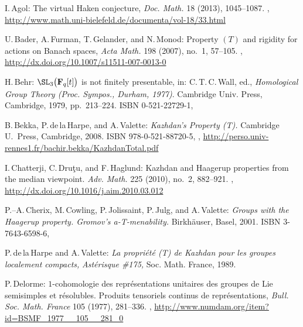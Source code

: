 \begin{references}{99}

I.\,Agol: 
The virtual Haken conjecture,
\emph{Doc. Math.} 18 (2013), 1045--1087. 
,
\url{http://www.math.uni-bielefeld.de/documenta/vol-18/33.html}

U.\,Bader, A.\,Furman, T.\,Gelander, and N.\,Monod:
Property $(T)$ and rigidity for actions on Banach spaces,
\emph{Acta Math.} 198 (2007), no.~1, 57--105. 
,
\url{http://dx.doi.org/10.1007/s11511-007-0013-0}

H.\,Behr:
$\SL_3 \bigl( \mathbf{F}_q[t] \bigr)$ is not finitely presentable,
in: C.\,T.\,C.\,Wall, ed.,
\emph{Homological Group Theory (Proc. Sympos., Durham, 1977)}.
Cambridge Univ. Press, Cambridge, 1979, pp.~213--224.
ISBN 0-521-22729-1,

B.\,Bekka, P.\,de\,la\,Harpe, and A.\,Valette:
\emph{Kazhdan's Property (T).}
Cambridge U.\ Press, Cambridge, 2008.
ISBN 978-0-521-88720-5,
,
\maynewline
\url{http://perso.univ-rennes1.fr/bachir.bekka/KazhdanTotal.pdf}

I.\,Chatterji, C.\,Dru\c tu, and F.\,Haglund:
Kazhdan and Haagerup properties from the median viewpoint. 
\emph{Adv. Math.} 225 (2010), no.~2, 882--921.
,
\maynewline
\url{http://dx.doi.org/10.1016/j.aim.2010.03.012}

P.--A.\,Cherix, M.\,Cowling, P.\,Jolissaint, P.\,Julg, and A.\,Valette:
\emph{Groups with the Haagerup property.
Gromov's a-T-menability.}
Birkh\"auser, Basel, 2001. 
ISBN 3-7643-6598-6,

 P.\,de\,la\,Harpe and A.\,Valette:
 \emph{La propri\'et\'e (T) de Kazhdan pour les groupes
localement compacts,}
 \emph{Ast\'erisque \#175,}
 Soc. Math. France, 1989.

P.\,Delorme:
$1$-cohomologie des repr\'esentations unitaires des groupes de Lie semisimples
et r\'esolubles. Produits tensoriels continus de repr\'esentations,
\emph{Bull. Soc. Math. France} 105 (1977), 281--336.
,
\maynewline
\url{http://www.numdam.org/item?id=BSMF_1977__105__281_0}



\end{references}

